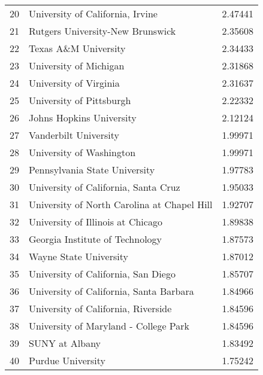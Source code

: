\begin{tabular}{rlr}
  20 & University of California, Irvine                               &  2.47441  \\
  21 & Rutgers University-New Brunswick                               &  2.35608  \\
  22 & Texas A\&M University                                           &  2.34433  \\
  23 & University of Michigan                                         &  2.31868  \\
  24 & University of Virginia                                         &  2.31637  \\
  25 & University of Pittsburgh                                       &  2.22332  \\
  26 & Johns Hopkins University                                       &  2.12124  \\
  27 & Vanderbilt University                                          &  1.99971  \\
  28 & University of Washington                                       &  1.99971  \\
  29 & Pennsylvania State University                                  &  1.97783  \\
  30 & University of California, Santa Cruz                           &  1.95033  \\
  31 & University of North Carolina at Chapel Hill                    &  1.92707  \\
  32 & University of Illinois at Chicago                              &  1.89838  \\
  33 & Georgia Institute of Technology                                &  1.87573  \\
  34 & Wayne State University                                         &  1.87012  \\
  35 & University of California, San Diego                            &  1.85707  \\
  36 & University of California, Santa Barbara                        &  1.84966  \\
  37 & University of California, Riverside                            &  1.84596  \\
  38 & University of Maryland - College Park                          &  1.84596  \\
  39 & SUNY at Albany                                                 &  1.83492  \\
  40 & Purdue University                                              &  1.75242  \\

\end{tabular}
